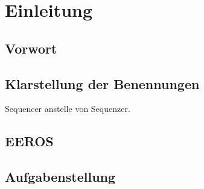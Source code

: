 \chapter{Einleitung}


\section{Vorwort}




\section{Klarstellung der Benennungen}
Sequencer anstelle von Sequenzer.



\section{EEROS}

\section{Aufgabenstellung}
